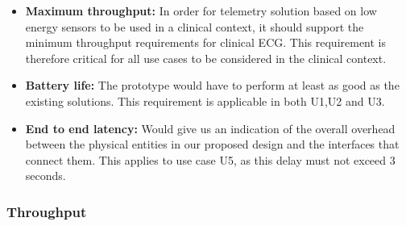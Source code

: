 \begin{itemize}
	\item \textbf{Maximum throughput:} In order for telemetry solution based on low energy sensors to be used in a clinical context, it should support the minimum throughput requirements for clinical ECG. This requirement is therefore critical for all use cases to be considered in the clinical context.
  	\item \textbf{Battery life:} The prototype would have to perform at least as good as the existing solutions. This requirement is applicable in both U1,U2 and U3. 
  	\item \textbf{End to end latency:} Would give us an indication of the overall overhead between the physical entities in our proposed design and the interfaces that connect them. This applies to use case U5, as this delay must not exceed 3 seconds.
\end{itemize}
\noindent

\subsubsection{Throughput} %
\label{ssub:throughput}

